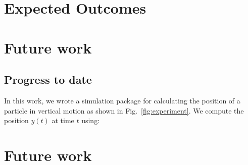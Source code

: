 \documentclass[project-plan]{report-template}
\begin{document}
\section{Expected Outcomes}

\section{Future work}
\subsection{Progress to date}
In this work, we wrote a simulation package for calculating the position of a particle in vertical motion as shown in Fig.~\ref{fig:experiment}. We compute the position $y(t)$ at time $t$ using:

\section{Future work}


\end{document}
